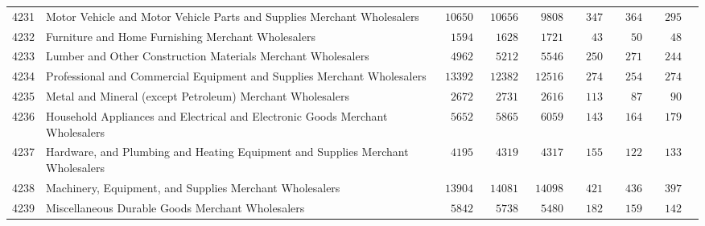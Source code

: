 \documentclass[9pt, oneside]{article}   	%
\begin{document}
\begin{longtable}{lp{3 in}ccccccc}
4231  & Motor Vehicle and Motor Vehicle Parts and Supplies Merchant Wholesalers & $\phantom{0}10650$ & $\phantom{0}10656$ & $\phantom{00}9808$ & $\phantom{00}347$ & $\phantom{00}364$ & $\phantom{00}295$ \\
4232  & Furniture and Home Furnishing Merchant Wholesalers & $\phantom{00}1594$ & $\phantom{00}1628$ & $\phantom{00}1721$ & $\phantom{000}43$ & $\phantom{000}50$ & $\phantom{000}48$ \\
4233  & Lumber and Other Construction Materials Merchant Wholesalers & $\phantom{00}4962$ & $\phantom{00}5212$ & $\phantom{00}5546$ & $\phantom{00}250$ & $\phantom{00}271$ & $\phantom{00}244$ \\
4234  & Professional and Commercial Equipment and Supplies Merchant Wholesalers & $\phantom{0}13392$ & $\phantom{0}12382$ & $\phantom{0}12516$ & $\phantom{00}274$ & $\phantom{00}254$ & $\phantom{00}274$ \\
4235  & Metal and Mineral (except Petroleum) Merchant Wholesalers & $\phantom{00}2672$ & $\phantom{00}2731$ & $\phantom{00}2616$ & $\phantom{00}113$ & $\phantom{000}87$ & $\phantom{000}90$ \\
4236  & Household Appliances and Electrical and Electronic Goods Merchant Wholesalers & $\phantom{00}5652$ & $\phantom{00}5865$ & $\phantom{00}6059$ & $\phantom{00}143$ & $\phantom{00}164$ & $\phantom{00}179$ \\
4237  & Hardware, and Plumbing and Heating Equipment and Supplies Merchant Wholesalers & $\phantom{00}4195$ & $\phantom{00}4319$ & $\phantom{00}4317$ & $\phantom{00}155$ & $\phantom{00}122$ & $\phantom{00}133$ \\
4238  & Machinery, Equipment, and Supplies Merchant Wholesalers & $\phantom{0}13904$ & $\phantom{0}14081$ & $\phantom{0}14098$ & $\phantom{00}421$ & $\phantom{00}436$ & $\phantom{00}397$ \\
4239  & Miscellaneous Durable Goods Merchant Wholesalers & $\phantom{00}5842$ & $\phantom{00}5738$ & $\phantom{00}5480$ & $\phantom{00}182$ & $\phantom{00}159$ & $\phantom{00}142$ \\


\end{longtable}
\end{document}
